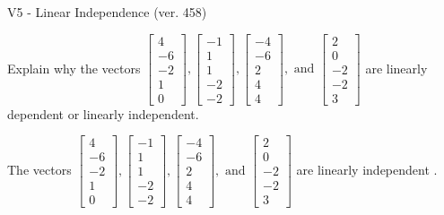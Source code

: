 \begin{exercise}
  \begin{exerciseTitle}V5 - Linear Independence (ver. 458)\end{exerciseTitle}
  \begin{exerciseStatement}
    Explain why the vectors \(\left[\begin{array}{r}
4 \\
-6 \\
-2 \\
1 \\
0
\end{array}\right] , \left[\begin{array}{r}
-1 \\
1 \\
1 \\
-2 \\
-2
\end{array}\right] , \left[\begin{array}{r}
-4 \\
-6 \\
2 \\
4 \\
4
\end{array}\right] , \text{ and } \left[\begin{array}{r}
2 \\
0 \\
-2 \\
-2 \\
3
\end{array}\right]\) are linearly dependent or linearly independent.	


  \end{exerciseStatement}
  \begin{exerciseAnswer}
   The vectors \(\left[\begin{array}{r}
4 \\
-6 \\
-2 \\
1 \\
0
\end{array}\right] , \left[\begin{array}{r}
-1 \\
1 \\
1 \\
-2 \\
-2
\end{array}\right] , \left[\begin{array}{r}
-4 \\
-6 \\
2 \\
4 \\
4
\end{array}\right] , \text{ and } \left[\begin{array}{r}
2 \\
0 \\
-2 \\
-2 \\
3
\end{array}\right]\) are 
  	 linearly independent  .
  


  \end{exerciseAnswer}
\end{exercise}